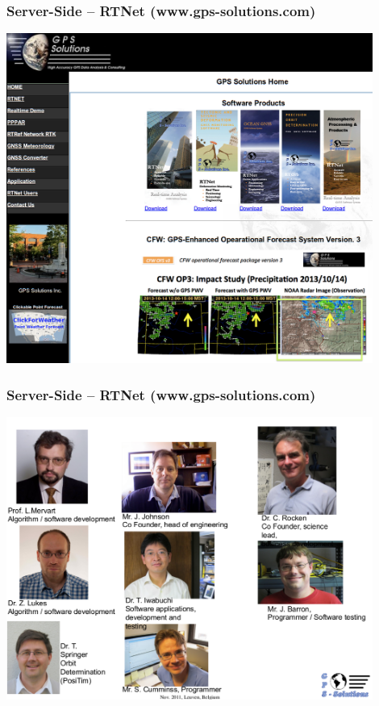 \documentclass[10pt]{beamer}
\begin{document}

\begin{frame}
\frametitle{Server-Side -- RTNet (www.gps-solutions.com)}
\includegraphics[width=0.9\textwidth,angle=0]{GPSS_home.png}
\end{frame}


\begin{frame}
\frametitle{Server-Side -- RTNet (www.gps-solutions.com)}
\includegraphics[width=0.9\textwidth,angle=0]{gpss_team.png}
\end{frame}
\end{document}
